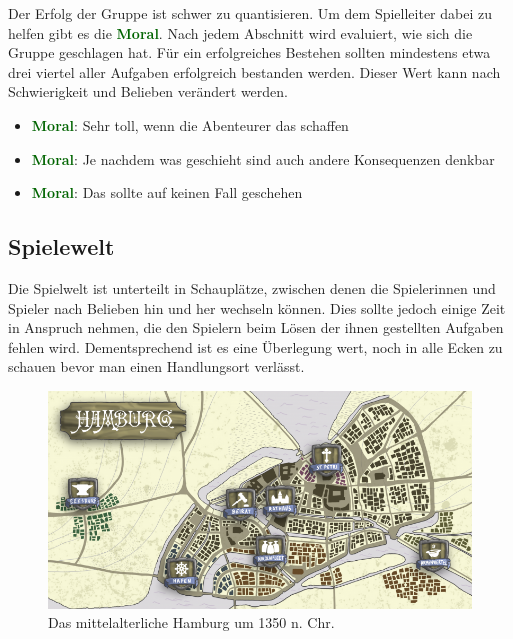 \newcommand{\Moral}[1][]{\textbf{\textcolor{darkgreen}{Moral\ifthenelse{\equal{#1}{}}{}{$\;(#1)$}}}}

Der Erfolg der Gruppe ist schwer zu quantisieren. Um dem Spielleiter dabei zu helfen
gibt es die \Moral. Nach jedem Abschnitt wird evaluiert, wie sich die Gruppe
geschlagen hat. Für ein erfolgreiches Bestehen sollten mindestens etwa drei viertel
aller Aufgaben erfolgreich bestanden werden. Dieser Wert kann nach Schwierigkeit und
Belieben verändert werden.

\begin{itemize}
\item \Moral[++]: Sehr toll, wenn die Abenteurer das schaffen
\item \Moral[+/0/-]: Je nachdem was geschieht sind auch andere Konsequenzen denkbar
\item \Moral[--]: Das sollte auf keinen Fall geschehen
\end{itemize}

\subsection*{Spielewelt}
\label{ssec:world}

Die Spielwelt ist unterteilt in Schauplätze, zwischen denen die Spielerinnen und
Spieler nach Belieben hin und her wechseln können. Dies sollte jedoch einige Zeit in
Anspruch nehmen, die den Spielern beim Lösen der ihnen gestellten Aufgaben fehlen
wird. Dementsprechend ist es eine Überlegung wert, noch in alle Ecken zu schauen
bevor man einen Handlungsort verlässt.

\begin{landscape}
	\hspace*{\fill}
	\begin{center}
		\begin{figure}
			\centering
			\includegraphics[width=1.0\paperwidth]{./01-img/map.png}
			\caption{Das mittelalterliche Hamburg um 1350 n. Chr.}
			\label{fig:map}
		\end{figure}
	\end{center}
\hfill
\end{landscape}
